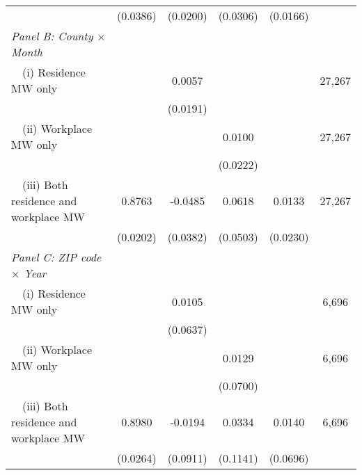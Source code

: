 \begin{landscape}
\begin{table}[ht!]
\begin{tabular}{@{}lccccc@{}}
                                                             & (0.0386) & (0.0200) & (0.0306) & (0.0166) &      \\
        \textit{Panel B: County $\times$ Month}              &       &       &       &       &      \\
        $\quad$(i) Residence MW only                         &       &  0.0057  &       &       & 27,267 \\
                                                             &       & (0.0191) &       &       &      \\
        $\quad$(ii) Workplace MW only                        &       &       &  0.0100  &       & 27,267 \\
                                                             &       &       & (0.0222) &       &      \\
        $\quad$(iii) Both residence and workplace MW         &  0.8763  &  -0.0485  &  0.0618  &  0.0133  & 27,267 \\
                                                             & (0.0202) & (0.0382) & (0.0503) & (0.0230) &      \\
        \textit{Panel C: ZIP code $\times$ Year}             &       &       &       &       &      \\
        $\quad$(i) Residence MW only                         &       &  0.0105  &       &       & 6,696 \\
                                                             &       & (0.0637) &       &       &      \\
        $\quad$(ii) Workplace MW only                        &       &       &  0.0129  &       & 6,696 \\
                                                             &       &       & (0.0700) &       &      \\
        $\quad$(iii) Both residence and workplace MW         &  0.8980  &  -0.0194  &  0.0334  &  0.0140  & 6,696 \\
                                                             & (0.0264) & (0.0911) & (0.1141) & (0.0696) &      \\ \bottomrule
    \end{tabular}
    

\end{table}
\end{landscape}
